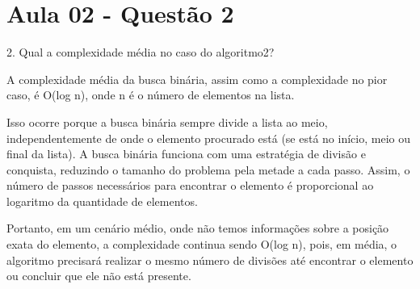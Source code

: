 \section{Aula 02 - Questão 2}

2. Qual a complexidade média no caso do algoritmo2?

A complexidade média da busca binária, assim como a complexidade no pior caso, é O(log n), onde n é o número de elementos na lista.

Isso ocorre porque a busca binária sempre divide a lista ao meio, independentemente de onde o elemento procurado está (se está no início, meio ou final da lista). A busca binária funciona com uma estratégia de divisão e conquista, reduzindo o tamanho do problema pela metade a cada passo. Assim, o número de passos necessários para encontrar o elemento é proporcional ao logaritmo da quantidade de elementos.

Portanto, em um cenário médio, onde não temos informações sobre a posição exata do elemento, a complexidade continua sendo O(log n), pois, em média, o algoritmo precisará realizar o mesmo número de divisões até encontrar o elemento ou concluir que ele não está presente.